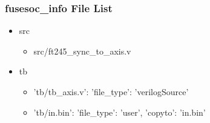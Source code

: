 \subsubsection{fusesoc\_info File List}
\begin{itemize}
\item src
	\begin{itemize}
	\item src/ft245\_sync\_to\_axis.v
	\end{itemize}
\item tb
	\begin{itemize}
	\item {'tb/tb\_axis.v': {'file\_type': 'verilogSource'}}
	\item {'tb/in.bin': {'file\_type': 'user', 'copyto': 'in.bin'}}
	\end{itemize}
\end{itemize}
